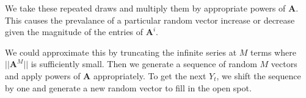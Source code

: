 \documentclass{article}
\begin{document}
        We take these repeated draws and multiply them by appropriate
        powers of $\bm{A}$. This causes the prevalance of a particular
        random vector increase or decrease given the magnitude of the 
        entries of $\bm{A}^i$.

        We could approximate this by truncating the infinite series
        at $M$ terms where $||\bm{A}^M||$ is sufficiently small.
        Then we generate a sequence of random $M$ vectors and apply 
        powers of $\bm{A}$ appropriately. To get the next $Y_t$, we shift
        the sequence by one and generate a new random vector to fill in 
        the open spot.
        

            
\end{document}
